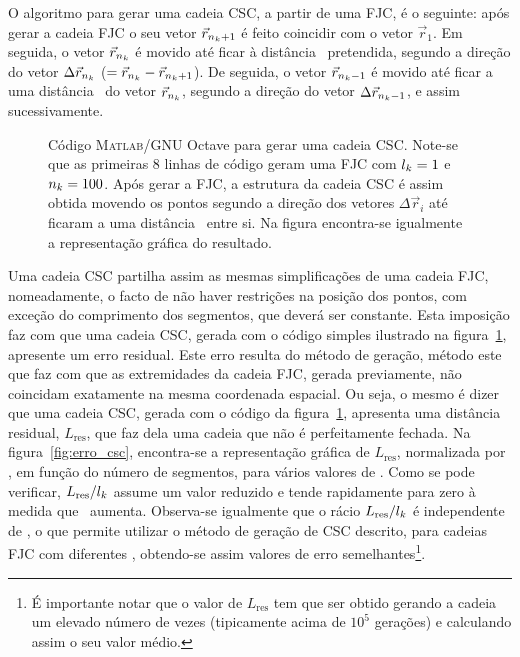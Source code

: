 O algoritmo para gerar uma cadeia CSC, a partir de uma FJC, é o seguinte: após gerar a cadeia FJC o seu vetor $\vec{r}_{n_{k}+1}$ é feito coincidir com o vetor $\vec{r}_{1}$. 
Em seguida, o vetor $\vec{r}_{n_{k}}$ é movido até ficar à distância \comsegmento\ pretendida, segundo a direção do vetor $\Delta\vec{r}_{n_{k}}$ ($=\vec{r}_{n_{k}}-\vec{r}_{n_{k}+1}$). De seguida, o vetor $\vec{r}_{n_{k}-1}$ é movido até ficar a uma distância \comsegmento\ do vetor $\vec{r}_{n_{k}}$, segundo a direção do vetor $\Delta\vec{r}_{n_{k}-1}$, e assim sucessivamente.
%
\begin{figure}[!t]
	\centering
	
	\caption[Código e representação gráfica de FJC e CSC em 2D]{Código \textsc{Matlab}\textsuperscript{\textregistered}/GNU Octave para gerar uma cadeia CSC. Note-se que as primeiras 8 linhas de código geram uma FJC com $l_{k}=1$ e $n_{k}=100$. Após gerar a FJC, a estrutura da cadeia CSC é assim obtida movendo os pontos segundo a direção dos vetores $\Delta\vec{r}_{i}$ até ficaram a uma distância \comsegmento\ entre si. Na figura encontra-se igualmente a representação gráfica do resultado.}
	\label{fig:csc_vs_fjc}
\end{figure}
%
Uma cadeia CSC partilha assim as mesmas simplificações de uma cadeia FJC, nomeadamente, o facto de não haver restrições na posição dos pontos, com exceção do comprimento dos segmentos, que deverá ser constante. Esta imposição faz com que uma cadeia CSC, gerada com o código simples ilustrado na figura~\ref{fig:csc_vs_fjc}, apresente um erro residual. 
Este erro resulta do método de geração, método este que faz com que as extremidades da cadeia FJC, gerada previamente, não coincidam exatamente na mesma coordenada espacial. Ou seja, o mesmo é dizer que uma cadeia CSC, gerada com o código da figura~\ref{fig:csc_vs_fjc}, apresenta uma distância residual, $L_{\mathrm{res}}$, que faz dela uma cadeia que não é perfeitamente fechada. Na figura~\ref{fig:erro_csc}, encontra-se a representação gráfica de $L_{\mathrm{res}}$, normalizada por \comsegmento, em função do número de segmentos, para vários valores de \comsegmento. Como se pode verificar, $L_{\mathrm{res}}/l_{k}$ assume um valor reduzido e tende rapidamente para zero à medida que \numsegmento\ aumenta. Observa-se igualmente que o rácio $L_{\mathrm{res}}/l_{k}$ é independente de \comsegmento, o que permite utilizar o método de geração de CSC descrito, para cadeias FJC com diferentes \comsegmento, obtendo-se assim valores de erro semelhantes\footnote{É importante notar que o valor de $L_{\mathrm{res}}$ tem que ser obtido gerando a cadeia um elevado número de vezes (tipicamente acima de $10^5$ gerações) e calculando assim o seu valor médio.}.    
